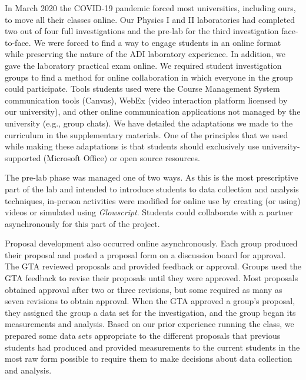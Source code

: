 \documentclass[aip, numerical, preprint]{revtex4-2}
\begin{document}
In March 2020 the COVID-19 pandemic forced most universities, including ours, to move all their
classes online. Our Physics \textrm{I} and \textrm{II} laboratories had completed two out of
four full investigations and the pre-lab for the third investigation face-to-face. We were
forced to find a way to engage students in an online format while preserving the nature of the
ADI laboratory experience. In addition, we gave the laboratory practical exam online. We
required student investigation groups to find a method for online collaboration in which
everyone in the group could participate. Tools students used were the Course Management System
communication tools (Canvas), WebEx (video interaction platform licensed by our university),
and other online communication applications not managed by the university (e.g., group
chats). We have detailed the adaptations we made to the curriculum in the supplementary
materials.  One of the principles that we used while making these adaptations is that students
should exclusively use university-supported (Microsoft Office) or open source resources.

The pre-lab phase was managed one of two ways.  As this is the most prescriptive part of the lab
and intended to introduce students to data collection and analysis techniques, in-person
activities were modified for online use by creating (or using) videos or simulated using
\emph{Glowscript}.\citep{glowscript} Students could collaborate with a partner asynchronously
for this part of the project.

Proposal development also occurred online asynchronously.  Each group produced their proposal
and posted a proposal form on a discussion board for approval. The GTA reviewed proposals and
provided feedback or approval. Groups used the GTA feedback to revise their proposals until
they were approved. Most proposals obtained approval after two or three revisions, but some
required as many as seven revisions to obtain approval. When the GTA approved a group's
proposal, they assigned the group a data set for the investigation, and the group began its
measurements and analysis. Based on our prior experience running the class, we prepared some
data sets appropriate to the different proposals that previous students had produced and
provided measurements to the current students in the most raw form possible to require them to
make decisions about data collection and analysis.
\end{document}
